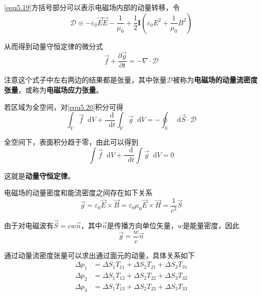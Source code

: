 \documentclass[UTF8]{ctexart}
\newcommand*{\dif}{\mathop{}\!\mathrm{d}}
\begin{document}
\noindent \autoref{equ5.19}方括号部分可以表示电磁场内部的动量转移，令
\begin{equation}
    \mathbf{\mathscr{D}} \equiv - \varepsilon_0 \vec{E} \vec{E} - \frac{1}{\mu_0} + \frac{1}{2} \mathbf{I}\left(\varepsilon_0 E^2 + \frac{1}{\mu_0}B^2\right)
\end{equation}

\noindent 从而得到动量守恒定律的微分式
\begin{equation}
    \vec{f} + \frac{\partial \vec{g}}{\partial t} = - \nabla \cdot \mathbf{\mathscr{D}} \label{equ5.20}
\end{equation}

\noindent 注意这个式子中左右两边的结果都是张量，其中张量$\mathbf{\mathscr{D}}$被称为\textbf{电磁场的动量流密度张量}，或称为\textbf{电磁场应力张量}。

    若区域为全空间，对\autoref{equ5.20}积分可得
    \begin{equation}
        \int_V \vec{f} \dif V + \frac{\dif}{\dif t} \int_V \vec{g} \dif V = - \oint_S \dif \vec{S} \cdot \mathbf{\mathscr{D}}
    \end{equation}

\noindent 全空间下，表面积分趋于零，由此可以得到
\begin{equation}
    \int \vec{f} \dif V + \frac{\dif }{\dif t} \int \vec{g} \dif V =0 \label{equ5.21}
\end{equation}

\noindent 这就是\textbf{动量守恒定律}。

    电磁场的动量密度和能流密度之间存在如下关系
    \begin{equation}
        \vec{g} = \varepsilon_0 \vec{E} \times \vec{B} = \varepsilon_0 \mu_0 \vec{E} \times \vec{H} = \frac{1}{c^2} \vec{S}\label{equ5.23}
    \end{equation}

\noindent 由于对电磁波有$\vec{S} = c w \vec{n}$，其中$\vec{n}$是传播方向单位矢量，$w$是能量密度，因此
\begin{equation}
    \vec{g} = \frac{w}{c} \vec{n}
\end{equation}

    通过动量流密度张量可以求出通过面元的动量，具体关系如下
    \begin{equation}
        \begin{aligned}
            \Delta p_{1}&=\Delta S_{1} T_{11}+\Delta S_{2} T_{21}+\Delta S_{3} T_{31}\\
            \Delta p_{2}&=\Delta S_{1} T_{12}+\Delta S_{2} T_{22}+\Delta S_{3} T_{32}\\
            \Delta p_{3}&=\Delta S_{1} T_{13}+\Delta S_{2} T_{23}+\Delta S_{3} T_{33}\\
        \end{aligned}
    \end{equation}
\end{document}
